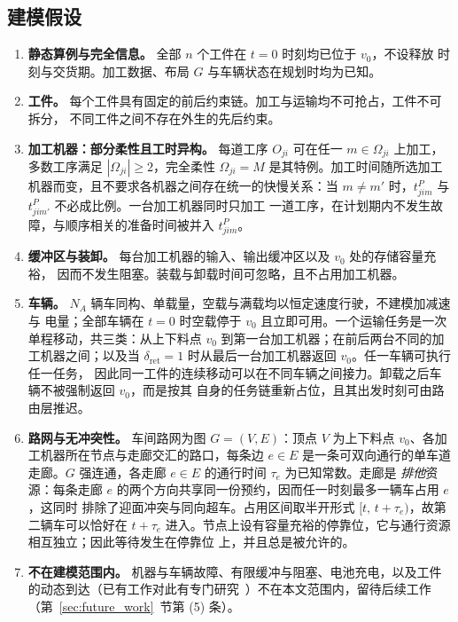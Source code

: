\documentclass[manuscript,screen,review]{acmart}
\begin{document}
\subsection{建模假设}
\label{sec:assumptions}

\begin{enumerate}[label=\textbf{A\arabic*.},leftmargin=*,topsep=2pt,itemsep=2pt]
\item \textbf{静态算例与完全信息。} 全部 $n$ 个工件在 $t=0$ 时刻均已位于 $v_0$，不设释放
时刻与交货期。加工数据、布局 $G$ 与车辆状态在规划时均为已知。

\item \textbf{工件。} 每个工件具有固定的前后约束链。加工与运输均不可抢占，工件不可拆分，
不同工件之间不存在外生的先后约束。

\item \textbf{加工机器：部分柔性且工时异构。} 每道工序 $O_{ji}$ 可在任一
$m\in\Omega_{ji}$ 上加工，多数工序满足 $|\Omega_{ji}|\ge 2$，完全柔性
$\Omega_{ji}=M$ 是其特例。加工时间随所选加工机器而变，且不要求各机器之间存在统一的快慢关系：当
$m\neq m'$ 时，$t^P_{jim}$ 与 $t^P_{jim'}$ 不必成比例。一台加工机器同时只加工
一道工序，在计划期内不发生故障，与顺序相关的准备时间被并入 $t^P_{jim}$。

\item \textbf{缓冲区与装卸。} 每台加工机器的输入、输出缓冲区以及 $v_0$ 处的存储容量充裕，
因而不发生阻塞。装载与卸载时间可忽略，且不占用加工机器。

\item \textbf{车辆。} $N_A$ 辆车同构、单载量，空载与满载均以恒定速度行驶，不建模加减速与
电量；全部车辆在 $t=0$ 时空载停于 $v_0$ 且立即可用。一个运输任务是一次单程移动，共三类：从上下料点 $v_0$ 到第一台加工机器；在前后两台不同的加工机器之间；以及当 $\delta_{\mathrm{ret}}=1$ 时从最后一台加工机器返回 $v_0$。任一车辆可执行任一任务，
因此同一工件的连续移动可以在不同车辆之间接力。卸载之后车辆不被强制返回 $v_0$，而是按其
自身的任务链重新占位，且其出发时刻可由路由层推迟。

\item \textbf{路网与无冲突性。} 车间路网为图 $G=(V,E)$：顶点 $V$ 为上下料点 $v_0$、各加工机器所在节点与走廊交汇的路口，每条边 $e\in E$ 是一条可双向通行的单车道走廊。$G$ 强连通，各走廊 $e\in E$ 的通行时间 $\tau_e$ 为已知常数。走廊是
\emph{排他}资源：每条走廊 $e$ 的两个方向共享同一份预约，因而任一时刻最多一辆车占用 $e$，这同时
排除了迎面冲突与同向超车。占用区间取半开形式 $[t,\,t+\tau_e)$，故第二辆车可以恰好在
$t+\tau_e$ 进入。节点上设有容量充裕的停靠位，它与通行资源相互独立；因此等待发生在停靠位
上，并且总是被允许的。

\item \textbf{不在建模范围内。} 机器与车辆故障、有限缓冲与阻塞、电池充电，以及工件的动态到达（已有工作对此有专门研究~\cite{gui2023dynamic,zhao2026deep}）不在本文范围内，留待后续工作（第~\ref{sec:future_work}~节第 (5) 条）。
\end{enumerate}
\end{document}
